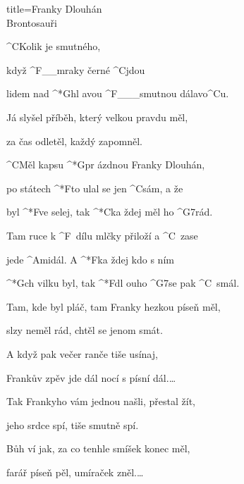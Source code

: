 \begin{song}{title=\predtitle\centering Franky Dlouhán \\\large Brontosauři  \vspace*{-0.3cm}}  %
\begin{centerjustified}
\nejvetsi

\sloka 
	^{C}Kolik je smutného,
	
	když ^{F{\color{white}\_\_}}mraky černé ^{C}jdou

	lidem nad ^*{G}hl avou ^{F{\color{white}\_\_\_}}smutnou dálavo^{C}u.
	
	Já slyšel příběh, který velkou pravdu měl,
	
	za čas odletěl, každý zapomněl.

	^{C}Měl kapsu ^*{G}pr ázdnou Franky Dlouhán,

	po státech ^*{F}to ulal se jen ^{C}sám, a že

	byl ^*{F}ve selej, tak ^*{C}ka ždej měl ho ^{G7}rád.

	Tam ruce k ^{F\,\,\,}dílu mlčky přiloží a ^{C\,\,\,}zase

	jede ^{Ami}dál. A ^*{F}ka ždej kdo s ním

	^*{G}ch vilku byl, tak ^*{F}dl ouho ^{G7}se pak ^{C\,\,\,}smál.
	
\sloka	
	Tam, kde byl pláč, tam Franky hezkou píseň měl,
	
	slzy neměl rád, chtěl se jenom smát.
	
	A když pak večer ranče tiše usínaj,
	
	Frankův zpěv jde dál nocí s písní dál.\elipsa\dots
	
\sloka
	Tak Frankyho vám jednou našli, přestal žít,
	
	jeho srdce spí, tiše smutně spí.
	
	Bůh ví jak, za co tenhle smíšek konec měl,
	
	farář píseň pěl, umíraček zněl.\elipsa\dots

\end{centerjustified}

\centering
{}

\setcounter{Slokočet}{0}
\end{song}
